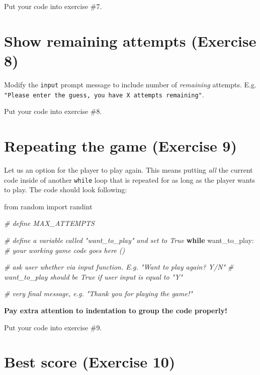 \documentclass[
]{book}
\newenvironment{Shaded}{\begin{snugshade}}{\end{snugshade}}
\newcommand{\CommentTok}[1]{\textcolor[rgb]{0.56,0.35,0.01}{\textit{#1}}}
\newcommand{\ControlFlowTok}[1]{\textcolor[rgb]{0.13,0.29,0.53}{\textbf{#1}}}
\newcommand{\ImportTok}[1]{#1}
\newcommand{\NormalTok}[1]{#1}
\begin{document}
Put your code into exercise \#7.

\hypertarget{show-remaining-attempts-exercise-8}{%
\section{Show remaining attempts (Exercise 8)}\label{show-remaining-attempts-exercise-8}}

Modify the \texttt{input} prompt message to include number of \emph{remaining} attempts. E.g. \texttt{"Please\ enter\ the\ guess,\ you\ have\ X\ attempts\ remaining"}.

Put your code into exercise \#8.

\hypertarget{repeating-the-game-exercise-9}{%
\section{Repeating the game (Exercise 9)}\label{repeating-the-game-exercise-9}}

Let us an option for the player to play again. This means putting \emph{all} the current code inside of another \texttt{while} loop that is repeated for as long as the player wants to play. The code should look following:

\begin{Shaded}
\begin{Highlighting}[]
\ImportTok{from}\NormalTok{ random }\ImportTok{import}\NormalTok{ randint}

\CommentTok{\# define MAX\_ATTEMPTS}

\CommentTok{\# define a variable called "want\_to\_play" and set to True}
\ControlFlowTok{while}\NormalTok{ want\_to\_play:}
  \CommentTok{\# your working game code goes here ()}
  
  \CommentTok{\# ask user whether via input function. E.g. "Want to play again? Y/N"}
  \CommentTok{\# want\_to\_play should be True if user input is equal to "Y"}
  
\CommentTok{\# very final message, e.g. "Thank you for playing the game!"}
\end{Highlighting}
\end{Shaded}

\textbf{Pay extra attention to indentation to group the code properly!}

Put your code into exercise \#9.

\hypertarget{best-score-exercise-10}{%
\section{Best score (Exercise 10)}\label{best-score-exercise-10}}
\end{document}
